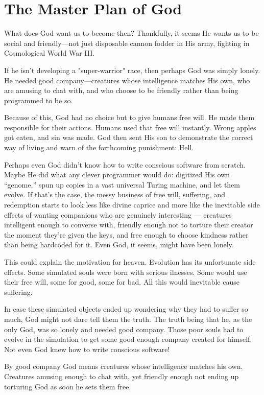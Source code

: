 \section{The Master Plan of God}

What does God want us to become then?
Thankfully, it seems He wants us to be social and friendly—not just disposable cannon fodder in His army, fighting in Cosmological World War III.

If he isn't developing a "super-warrior" race, then perhaps God was simply lonely.
He needed good company—creatures whose intelligence matches His own, who are amusing to chat with, and who choose to be friendly rather than being programmed to be so.

Because of this, God had no choice but to give humans free will. He made them responsible for their actions.
Humans used that free will instantly. Wrong apples got eaten, and sin was made.
God then sent His son to demonstrate the correct way of living and warn of the forthcoming punishment: Hell.

Perhaps even God didn’t know how to write conscious software from scratch.
Maybe He did what any clever programmer would do: digitized His own “genome,” spun up copies in a vast universal Turing machine, and let them evolve.
If that’s the case, the messy business of free will, suffering, and redemption starts to look less like divine caprice and more like the inevitable side effects of wanting companions who are genuinely interesting — creatures intelligent enough to converse with, friendly enough not to torture their creator the moment they’re given the keys, and free enough to choose kindness rather than being hardcoded for it.
Even God, it seems, might have been lonely.

This could explain the motivation for heaven. Evolution has its unfortunate side effects.
Some simulated souls were born with serious ilnesses. Some would use their free will, some for good, some
for bad. All this would inevitable cause suffering. 
  
In case these simulated objects ended up wondering why they had to suffer so much, God might not dare tell them the truth.
The truth being that he, as the only God, was so lonely and needed good company. Those poor souls had to evolve in the simulation
to get some good enough company created for himself. Not even God knew how to write conscious software! 
  
By good company God means creatures whose intelligence  matches his own. Creatures amusing enough to chat with, yet
friendly enough not ending up torturing God as soon he sets them free. 
  
